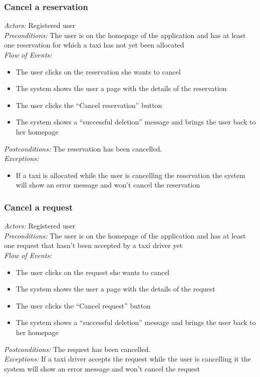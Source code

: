 \documentclass{article}
\begin{document}
\subsubsection{Cancel a reservation}
\textit{Actors:} Registered user
\\\textit{Preconditions:} The user is on the homepage of the application and has at least one reservation for which a taxi has not yet been allocated
\\\textit{Flow of Events:}
\begin{itemize}
	\item  The user clicks on the reservation she wants to cancel
	\item  The system shows the user a page with the details of the reservation
	\item  The user clicks the ``Cancel reservation'' button
	\item  The system shows a ``successful deletion'' message and brings the user back to her homepage
\end{itemize}
\textit{Postconditions:} The reservation has been cancelled.
\\\textit{Exceptions:}
\begin{itemize} 
	\item If a taxi is allocated while the user is cancelling the reservation the system will show an error message and won't cancel the reservation
\end{itemize}

\subsubsection{Cancel a request}
\textit{Actors:} Registered user
\\\textit{Preconditions:} The user is on the homepage of the application and has at least one request that hasn't been accepted by a taxi driver yet
\\\textit{Flow of Events:}
\begin{itemize}
	\item  The user clicks on the request she wants to cancel
	\item  The system shows the user a page with the details of the request
	\item  The user clicks the ``Cancel request'' button
	\item  The system shows a ``successful deletion'' message and brings the user back to her homepage
\end{itemize}
\textit{Postconditions:} The request has been cancelled.
\\\textit{Exceptions:} If a taxi driver accepts the request while the user is cancelling it the system will show an error message and won't cancel the request
\end{document}
